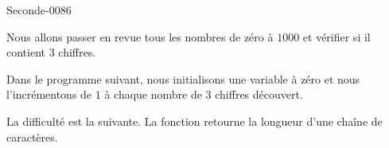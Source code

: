 
\begin{corrige}{Seconde-0086}


    Nous allons passer en revue tous les nombres de zéro à \( 1000\) et vérifier si il contient \( 3\) chiffres.

    Dans le programme suivant, nous initialisons une variable  à zéro et nous l'incrémentons de \( 1\) à chaque nombre de \( 3\) chiffres découvert.

    

    La difficulté est la suivante. La fonction  retourne la longueur d'une chaîne de caractères.


\end{corrige}

